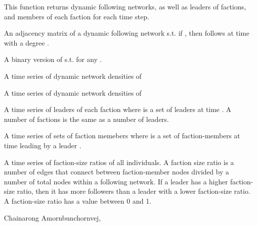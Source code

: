 \documentclass[a4paper]{book}
\begin{document}
\begin{Value}
This function returns dynamic following networks, as well as leaders of factions, and members of each faction for each time step.

\begin{ldescription}
\item[\code{dyNetOut\$dyNetWeightedMat}]  An adjacency matrix of a dynamic following network
s.t. if , then  follows   at time  with a degree . 
\item[\code{dyNetOut\$dyNetBinMat}]  A binary version of  s.t.  for any .  
\item[\code{dyNetOut\$dyNetWeightedDensityVec}] A time series of dynamic network densities of 
\item[\code{dyNetOut\$dyNetBinDensityVec}] A time series of dynamic network densities of 
\item[\code{leadersTimeSeries}] A time series of leaders of each faction where  is a set of leaders at time . A number of factions is the same as a number of leaders.
\item[\code{factionMembersTimeSeries}] A time series of sets of faction memebers where  is a set of faction-members at time  leading by a leader . 
\item[\code{factionSizeRatioTimeSeries}] A time series of faction-size ratios of all individuals. A faction size ratio is a number of edges that connect between faction-member nodes divided by a number of total nodes within a following network. If a leader has a higher faction-size ratio, then it has more followers than a leader with a lower faction-size ratio. A faction-size ratio has a value between 0 and 1.
\end{ldescription}
\end{Value}
%
\begin{Author}\relax
Chainarong Amornbunchornvej, 
\end{Author}
%
\begin{Examples}
\end{Examples}
\end{document}
